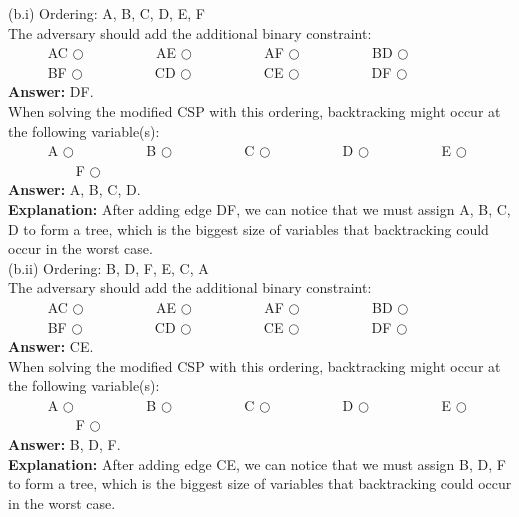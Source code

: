\documentclass{article}
\begin{document}
\noindent (b.i) Ordering: A, B, C, D, E, F\\

The adversary should add the additional binary constraint:\\
\indent ~~~~~ AC $\bigcirc$ ~~~~~~~~~  AE $\bigcirc$ ~~~~~~~~~  AF $\bigcirc$ ~~~~~~~~~  BD $\bigcirc$  \\
\indent ~~~~~ BF $\bigcirc$ ~~~~~~~~~  CD $\bigcirc$ ~~~~~~~~~  CE $\bigcirc$ ~~~~~~~~~  DF $\bigcirc$  \\

\textbf{Answer:} DF. \\

When solving the modified CSP with this ordering, backtracking might occur at the following variable(s):\\
\indent ~~~~~ A $\bigcirc$ ~~~~~~~~~  B $\bigcirc$ ~~~~~~~~~  C $\bigcirc$ ~~~~~~~~~  D $\bigcirc$ ~~~~~~~~~  E $\bigcirc$~~~~~~~~~  F $\bigcirc$ \\

\textbf{Answer:} A, B, C, D. \\

\textbf{Explanation:} After adding edge DF, we can notice that we must assign A, B, C, D to form a tree, which is the biggest size of variables that backtracking could occur in the worst case. \\

\noindent (b.ii) Ordering: B, D, F, E, C, A\\

The adversary should add the additional binary constraint:\\
\indent ~~~~~ AC $\bigcirc$ ~~~~~~~~~  AE $\bigcirc$ ~~~~~~~~~  AF $\bigcirc$ ~~~~~~~~~  BD $\bigcirc$  \\
\indent ~~~~~ BF $\bigcirc$ ~~~~~~~~~  CD $\bigcirc$ ~~~~~~~~~  CE $\bigcirc$ ~~~~~~~~~  DF $\bigcirc$  \\


\textbf{Answer:} CE. \\

When solving the modified CSP with this ordering, backtracking might occur at the following variable(s):\\
\indent ~~~~~ A $\bigcirc$ ~~~~~~~~~  B $\bigcirc$ ~~~~~~~~~  C $\bigcirc$ ~~~~~~~~~  D $\bigcirc$ ~~~~~~~~~  E $\bigcirc$~~~~~~~~~  F $\bigcirc$ \\

\textbf{Answer:} B, D, F. \\

\textbf{Explanation:} After adding edge CE, we can notice that we must assign B, D, F to form a tree, which is the biggest size of variables that backtracking could occur in the worst case. \\
\end{document}
